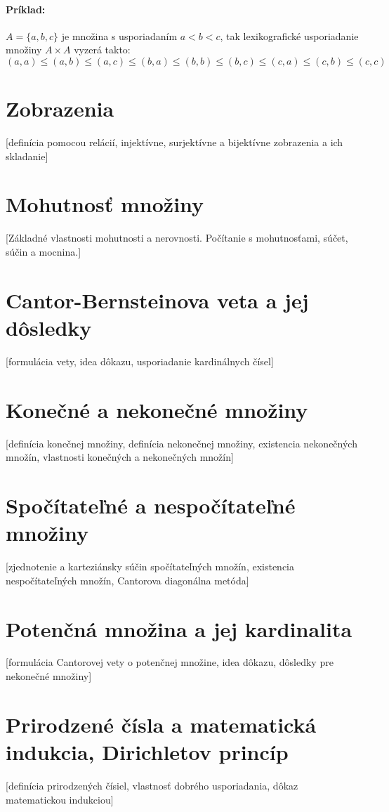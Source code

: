 		\paragraph{Príklad: }
		$A = \{a,b,c\}$ je množina s usporiadaním $a < b < c $, tak lexikografické usporiadanie množiny $A \times A$ vyzerá takto: $(a,a) \leq ( a,b) \leq ( a,c) \leq (b,a) \leq (b,b) \leq (b,c) \leq ( c,a) \leq ( c,b) \leq ( c,c)$


\section{Zobrazenia}
	[definícia pomocou relácií, injektívne, surjektívne a bijektívne zobrazenia a ich skladanie] 

\section {Mohutnosť množiny}
  [Základné vlastnosti mohutnosti a nerovnosti. Počítanie s mohutnosťami, súčet, súčin a mocnina.] 

\section {Cantor-Bernsteinova veta a jej dôsledky}
  [formulácia vety, idea dôkazu, usporiadanie kardinálnych čísel] 

\section {Konečné a nekonečné množiny}
  [definícia konečnej množiny, definícia nekonečnej množiny, existencia nekonečných množín, vlastnosti konečných a nekonečných množín]

\section {Spočítateľné a nespočítateľné množiny}
  [zjednotenie a karteziánsky súčin spočítateľných množín, existencia nespočítateľných množín, Cantorova diagonálna metóda]

\section {Potenčná množina a jej kardinalita}
  [formulácia Cantorovej vety o potenčnej množine, idea dôkazu, dôsledky pre nekonečné množiny] 

\section {Prirodzené čísla a matematická indukcia, Dirichletov princíp}
  [definícia prirodzených čísiel, vlastnosť dobrého usporiadania, dôkaz matematickou indukciou]

